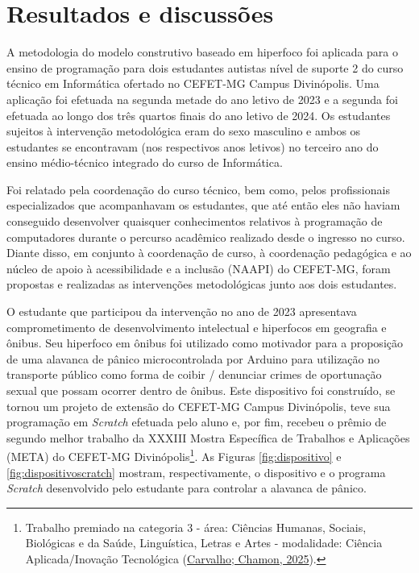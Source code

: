 \documentclass[
  12pt,
  a4paper,
]{article}
\begin{document}
\hypertarget{sec:resultados}{%
\section{Resultados e discussões}\label{sec:resultados}}

A metodologia do modelo construtivo baseado em hiperfoco foi aplicada
para o ensino de programação para dois estudantes autistas nível de
suporte 2 do curso técnico em Informática ofertado no CEFET-MG Campus
Divinópolis. Uma aplicação foi efetuada na segunda metade do ano letivo
de 2023 e a segunda foi efetuada ao longo dos três quartos finais do ano
letivo de 2024. Os estudantes sujeitos à intervenção metodológica eram
do sexo masculino e ambos os estudantes se encontravam (nos respectivos
anos letivos) no terceiro ano do ensino médio-técnico integrado do curso
de Informática.

Foi relatado pela coordenação do curso técnico, bem como, pelos
profissionais especializados que acompanhavam os estudantes, que até
então eles não haviam conseguido desenvolver quaisquer conhecimentos
relativos à programação de computadores durante o percurso acadêmico
realizado desde o ingresso no curso. Diante disso, em conjunto à
coordenação de curso, à coordenação pedagógica e ao núcleo de apoio à
acessibilidade e a inclusão (NAAPI) do CEFET-MG, foram propostas e
realizadas as intervenções metodológicas junto aos dois estudantes.

O estudante que participou da intervenção no ano de 2023 apresentava
comprometimento de desenvolvimento intelectual e hiperfocos em geografia
e ônibus. Seu hiperfoco em ônibus foi utilizado como motivador para a
proposição de uma alavanca de pânico microcontrolada por Arduino para
utilização no transporte público como forma de coibir / denunciar crimes
de oportunação sexual que possam ocorrer dentro de ônibus. Este
dispositivo foi construído, se tornou um projeto de extensão do CEFET-MG
Campus Divinópolis, teve sua programação em \emph{Scratch} efetuada pelo
aluno e, por fim, recebeu o prêmio de segundo melhor trabalho da XXXIII
Mostra Específica de Trabalhos e Aplicações (META) do CEFET-MG
Divinópolis\footnote{Trabalho premiado na categoria 3 - área: Ciências
  Humanas, Sociais, Biológicas e da Saúde, Linguística, Letras e Artes -
  modalidade: Ciência Aplicada/Inovação Tecnológica
  (\protect\hyperlink{ref-certificadometa2025}{Carvalho; Chamon, 2025}).}.
As Figuras \ref{fig:dispositivo} e \ref{fig:dispositivoscratch} mostram,
respectivamente, o dispositivo e o programa \emph{Scratch} desenvolvido
pelo estudante para controlar a alavanca de pânico.
\end{document}
